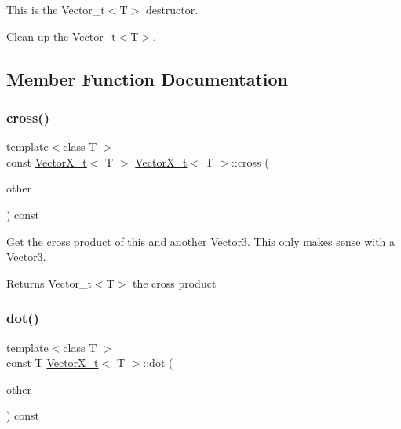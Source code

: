 This is the Vector\+\_\+t$<$\+T$>$ destructor. 

Clean up the Vector\+\_\+t$<$\+T$>$. 

\subsection{Member Function Documentation}
\mbox{\label{class_vector_x__t_a8384a54196c5416ccca9312a87f23321}} 
\subsubsection{\texorpdfstring{cross()}{cross()}}
{\footnotesize\ttfamily template$<$class T $>$ \\
const \hyperlink{class_vector_x__t}{Vector\+X\+\_\+t}$<$ T $>$ \hyperlink{class_vector_x__t}{Vector\+X\+\_\+t}$<$ T $>$\+::cross (\begin{DoxyParamCaption}\item[{const \hyperlink{class_vector_x__t}{Vector\+X\+\_\+t}$<$ T $>$ \&}]{other }\end{DoxyParamCaption}) const}



Get the cross product of this and another Vector3. This only makes sense with a Vector3. 

\begin{DoxyReturn}{Returns}
Vector\+\_\+t$<$\+T$>$ the cross product 
\end{DoxyReturn}
\mbox{\label{class_vector_x__t_a47edb26aa302ab3611ec850f56b1a0f0}} 
\subsubsection{\texorpdfstring{dot()}{dot()}}
{\footnotesize\ttfamily template$<$class T $>$ \\
const T \hyperlink{class_vector_x__t}{Vector\+X\+\_\+t}$<$ T $>$\+::dot (\begin{DoxyParamCaption}\item[{const \hyperlink{class_vector_x__t}{Vector\+X\+\_\+t}$<$ T $>$ \&}]{other }\end{DoxyParamCaption}) const}



